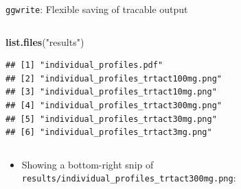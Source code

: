 \documentclass[
  8pt,
  ignorenonframetext,
  aspectratio=169]{beamer}
\newenvironment{Shaded}{\begin{snugshade}}{\end{snugshade}}
\newcommand{\KeywordTok}[1]{\textcolor[rgb]{0.13,0.29,0.53}{\textbf{#1}}}
\newcommand{\NormalTok}[1]{#1}
\newcommand{\StringTok}[1]{\textcolor[rgb]{0.31,0.60,0.02}{#1}}
\providecommand{\tightlist}{%
  \setlength{\itemsep}{0pt}\setlength{\parskip}{0pt}}
\begin{document}
\begin{frame}[fragile]{\texttt{ggwrite}: Flexible saving of tracable
output}
\begin{columns}[T]
\begin{column}{0.48\textwidth}
\begin{Shaded}
\begin{Highlighting}[]
\KeywordTok{list.files}\NormalTok{(}\StringTok{"results"}\NormalTok{)}
\end{Highlighting}
\end{Shaded}

\begin{verbatim}
## [1] "individual_profiles.pdf"            
## [2] "individual_profiles_trtact100mg.png"
## [3] "individual_profiles_trtact10mg.png" 
## [4] "individual_profiles_trtact300mg.png"
## [5] "individual_profiles_trtact30mg.png" 
## [6] "individual_profiles_trtact3mg.png"
\end{verbatim}
\end{column}
\end{columns}

\begin{itemize}
\tightlist
\item
  Showing a bottom-right snip of
  \texttt{results/individual\_profiles\_trtact300mg.png}:
\end{itemize}

\begin{center}
\end{center}
\end{frame}
\end{document}

